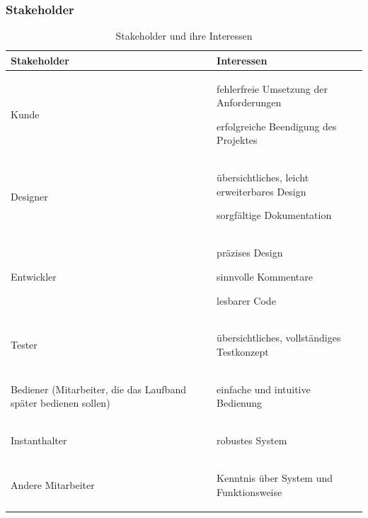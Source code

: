 \documentclass[a4paper, 11pt]{article}
\begin{document}
\subsubsection{Stakeholder}
\begin{table}[h]
\center
\begin{tabularx}{\textwidth}{|X|X|}
\hline
\textbf{Stakeholder}&\textbf{Interessen}\\
\hline
Kunde&\begin{compactenum}[-]
      \item fehlerfreie Umsetzung der Anforderungen
      \item erfolgreiche Beendigung des Projektes 
      \end{compactenum}\\
\hline
Designer&\begin{compactenum}[-]
         \item übersichtliches, leicht erweiterbares Design
         \item sorgfältige Dokumentation 
         \end{compactenum}\\ 
\hline
Entwickler&\begin{compactenum}[-]
           \item präzises Design
           \item sinnvolle Kommentare
           \item lesbarer Code 
           \end{compactenum}\\
\hline
Tester&\begin{compactenum}[-]
       \item übersichtliches, vollständiges Testkonzept 
       \end{compactenum}\\
\hline
Bediener (Mitarbeiter, die das Laufband später bedienen sollen)&\begin{compactenum}[-]
\item einfache und intuitive Bedienung
\end{compactenum}\\
\hline
Instanthalter&\begin{compactenum}[-]
              \item robustes System
              \end{compactenum}\\
\hline
Andere Mitarbeiter&\begin{compactenum}[-]
                   \item Kenntnis über System und Funktionsweise
                   \end{compactenum}\\
\hline
\end{tabularx}
\caption{Stakeholder und ihre Interessen}
\label{stake}
\end{table}
\end{document}
